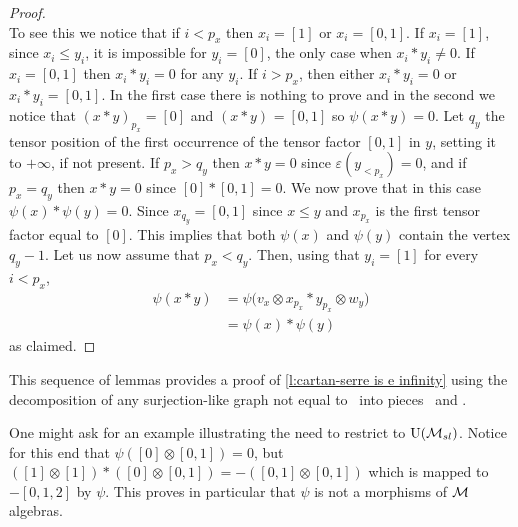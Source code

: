 \begin{proof}
\[	\]
	To see this we notice that if $i < p_x$ then $x_i = [1]$ or $x_i = [0,1]$.
	If $x_i = [1]$, since $x_i \leq y_i$, it is impossible for $y_i = [0]$, the only case when $x_i \ast y_i \neq 0$.
	If $x_i = [0,1]$ then $x_i \ast y_i = 0$ for any $y_i$.
	If $i > p_x$, then either $x_i \ast y_i = 0$ or $x_i \ast y_i = [0,1]$.
	In the first case there is nothing to prove and in the second we notice that $(x \ast y)_{p_x} = [0]$ and $(x \ast y)_{} = [0,1]$ so $\psi(x \ast y) = 0$.
	Let $q_y$ the tensor position of the first occurrence of the tensor factor $[0,1]$ in $y$, setting it to $+\infty$, if not present.
	If $p_x > q_y$ then $x \ast y = 0$ since $\varepsilon(y_{<p_x}) = 0$, and if $p_x = q_y$ then $x \ast y = 0$ since $[0] \ast [0,1] = 0$.
	We now prove that in this case $\psi(x) \ast \psi(y) = 0$.
	Since $x_{q_y} = [0,1]$ since $x \leq y$ and $x_{p_x}$ is the first tensor factor equal to $[0]$.
	This implies that both $\psi(x)$ and $\psi(y)$ contain the vertex $q_{y} - 1$.
	Let us now assume that $p_x < q_y$.
	Then, using that $y_i = [1]$ for every $i < p_x$,
	\begin{align*}
	\psi(x \ast y) & =
	\psi \big( v_x \otimes x_{p_x} \ast y_{p_x} \otimes w_y \big) \\ & =
	\psi(x) \ast \psi(y)
	\end{align*}
	as claimed.
\end{proof}

This sequence of lemmas provides a proof of \cref{l:cartan-serre is e infinity} using the decomposition of any surjection-like graph not equal to \counit \ into pieces \coproduct \ and \product.

\begin{remark}
	One might ask for an example illustrating the need to restrict to ${\operatorname{U}(\mathcal{M}_{sl})}$.
	Notice for this end that $\psi([0] \otimes [0,1]) = 0$, but $([1] \otimes [1]) \ast ([0] \otimes [0,1]) = -([0,1] \otimes [0,1])$ which is mapped to $-[0,1,2]$ by $\psi$.
	This proves in particular that $\psi$ is not a morphisms of $\mathcal{M}$ algebras.
\end{remark}